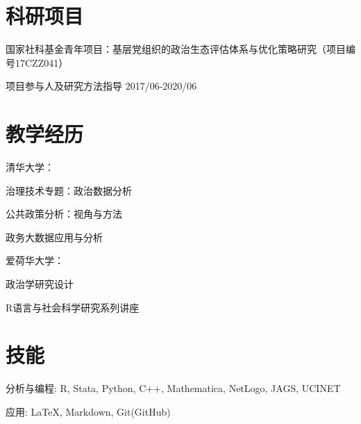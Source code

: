 \documentclass[10.5pt,]{article}
\providecommand{\tightlist}{%
	\setlength{\itemsep}{0pt}\setlength{\parskip}{0pt}}
\renewenvironment{itemize}{
	\begin{list}{}{
			\setlength{\leftmargin}{1.5em}
		}
	}{
	\end{list}
}
\begin{document}
\hypertarget{ux79d1ux7814ux9879ux76ee}{%
\section{科研项目}\label{ux79d1ux7814ux9879ux76ee}}

\begin{itemize}
\tightlist
\item
  国家社科基金青年项目：基层党组织的政治生态评估体系与优化策略研究（项目编号17CZZ041）

  \begin{itemize}
  \tightlist
  \item
    项目参与人及研究方法指导 \hfill 2017/06-2020/06
  \end{itemize}
\end{itemize}

\hypertarget{ux6559ux5b66ux7ecfux5386}{%
\section{教学经历}\label{ux6559ux5b66ux7ecfux5386}}

\begin{itemize}
\tightlist
\item
  清华大学：

  \begin{itemize}
  \tightlist
  \item
    治理技术专题：政治数据分析
  \item
    公共政策分析：视角与方法
  \item
    政务大数据应用与分析
  \end{itemize}
\item
  爱荷华大学：

  \begin{itemize}
  \tightlist
  \item
    政治学研究设计
  \item
    R语言与社会科学研究系列讲座
  \end{itemize}
\end{itemize}

\hypertarget{ux6280ux80fd}{%
\section{技能}\label{ux6280ux80fd}}

\begin{itemize}
\tightlist
\item
  分析与编程: R, Stata, Python, C++, Mathematica, NetLogo, JAGS, UCINET
\item
  应用: \LaTeX, Markdown, Git(GitHub)
\end{itemize}
	
			
\end{document}
